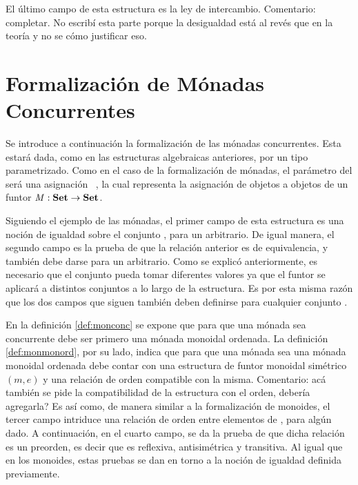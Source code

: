 El último campo de esta estructura es la ley de intercambio. {\color{red} Comentario: completar. No escribí esta parte porque la desigualdad está al revés que en la teoría y no se cómo justificar eso.}

\section{Formalización de Mónadas Concurrentes}\label{form:monconc}

Se introduce a continuación la formalización de las mónadas concurrentes. Esta estará dada, como en las estructuras algebraicas anteriores, por un tipo  parametrizado. Como en el caso de la formalización de mónadas, el parámetro del   será una asignación \hbox{ \AgdaSymbol{:}  \AgdaSymbol{$\rightarrow$} }, la cual representa la asignación de objetos a objetos de un funtor $\mathit{M} : \text{\bf Set} \rightarrow \text{\bf Set}$.


Siguiendo el ejemplo de las mónadas, el primer campo de esta estructura es una noción de igualdad sobre el conjunto , para un  arbitrario. De igual manera, el segundo campo es la prueba de que la relación anterior es de equivalencia, y también debe darse para un  arbitrario. Como se explicó anteriormente, es necesario que el conjunto  pueda tomar diferentes valores ya que el funtor  se aplicará a distintos conjuntos a lo largo de la estructura. Es por esta misma razón que los dos campos que siguen también deben definirse para cualquier conjunto . 

En la definición \ref{def:monconc} se expone que para que una mónada sea concurrente debe ser primero una mónada monoidal ordenada. La definición \ref{def:monmonord}, por su lado,
indica que para que una mónada sea una mónada monoidal ordenada debe contar con una estructura de funtor monoidal simétrico $(m,e)$ y una relación de orden compatible con la misma. {\color{red} Comentario: acá también se pide la compatibilidad de la estructura con el orden, debería agregarla?} Es así como, de manera similar a la formalización de monoides, el tercer campo intriduce una relación de orden entre elementos de , para algún  dado. A continuación, en el cuarto campo, se da la prueba de que dicha relación es un preorden, es decir que es reflexiva, antisimétrica y transitiva. Al igual que en los monoides, estas pruebas se dan en torno a la noción de igualdad definida previamente.

